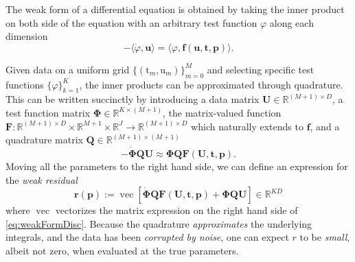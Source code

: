 \documentclass{juliacon}
\newcommand{\params}{\mathbf{p}}
\newcommand{\stateVar}{\boldsymbol{u}}
\newcommand{\testFun}{\varphi}
\newcommand{\testFunMat}{\boldsymbol{\Phi}}
\newcommand{\stateMat}{\mathbf{U}}
\newcommand{\quadMat}{\mathbf{Q}}
\newcommand{\timeVec}{\mathbf{t}}
\DeclareMathOperator{\vecOp}{vec}
\begin{document}
The weak form of a differential equation is obtained by taking the inner product on both side of the equation with an arbitrary test function $\testFun$ along each dimension
\begin{equation}\label{eq:weakForm}
    - \langle\dot{\testFun}, \stateVar \rangle  = \langle \testFun, \mathbf{f}(\stateVar,\timeVec,\params) \rangle.
\end{equation}

Given data on a uniform grid $\bigl\{(\mathrm{t}_m, \mathrm{u}_m)\bigr\}_{m=0}^M$ and selecting specific test functions $\{\testFun\}_{k=1}^K$, the inner products can be approximated through quadrature. This can be written succinctly by introducing a data matrix $\stateMat \in \mathbb{R}^{(M+1)\times D}$, a test function matrix $\testFunMat \in \mathbb{R}^{K\times (M+1)}$, the matrix-valued function $\mathbf{F}: \mathbb{R}^{(M+1)\times D}\times \mathbb{R}^{M+1} \times \mathbb{R}^J \rightarrow \mathbb{R}^{(M+1)\times D}$ which naturally extends to $\mathbf{f}$, and a quadrature matrix $\quadMat\in \mathbb{R}^{(M+1)\times (M+1)}$
\begin{equation}\label{eq:weakFormDisc}
    - \dot{\testFunMat} \quadMat \stateMat \approx \testFunMat \quadMat \mathbf{F}(\stateMat,\timeVec,\params) .
\end{equation}
Moving all the parameters to the right hand side, we can define an expression for the \emph{weak residual} 
\begin{equation}\label{eq:wres}
    \mathbf{r}(\params) := \vecOp\left[\dot{\testFunMat} \quadMat \mathbf{F}(\stateMat,\timeVec,\params) + \testFunMat \quadMat \stateMat\right] \in \mathbb{R}^{KD}
\end{equation}
where $\vecOp$ vectorizes the matrix expression on the right hand side of \cref{eq:weakFormDisc}. Because the quadrature  \emph{approximates} the underlying integrals, and the data has been \emph{corrupted by noise}, one can expect $r$ to be \emph{small}, albeit not zero,  when evaluated at the true parameters.
\end{document}
